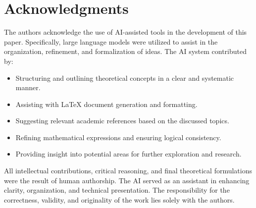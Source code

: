 \section*{Acknowledgments}

The authors acknowledge the use of AI-assisted tools in the development of this paper. Specifically, large language models were utilized to assist in the organization, refinement, and formalization of ideas. The AI system contributed by:
\begin{itemize}
    \item Structuring and outlining theoretical concepts in a clear and systematic manner.
    \item Assisting with LaTeX document generation and formatting.
    \item Suggesting relevant academic references based on the discussed topics.
    \item Refining mathematical expressions and ensuring logical consistency.
    \item Providing insight into potential areas for further exploration and research.
\end{itemize}

All intellectual contributions, critical reasoning, and final theoretical formulations were the result of human authorship. The AI served as an assistant in enhancing clarity, organization, and technical presentation. The responsibility for the correctness, validity, and originality of the work lies solely with the authors.

